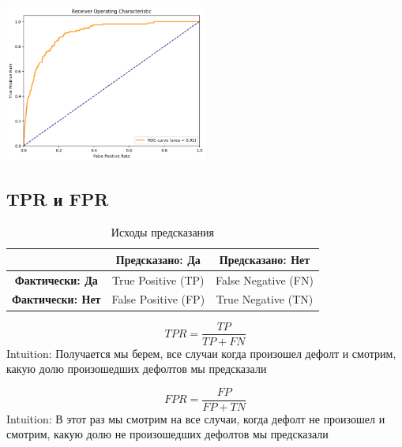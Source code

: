 \documentclass{article}
\begin{document}
        \begin{center}
            \includegraphics[width=0.5\textwidth]{photos/roc.png}
        \end{center}



        \subsection{TPR и FPR}
            \begin{table}[h] %
                \centering %
                \caption{Исходы предсказания} %
                \begin{tabular}{|c|c|c|}
                    \hline
                    & \textbf{Предсказано: Да} & \textbf{Предсказано: Нет} \\ \hline
                    \textbf{Фактически: Да} & True Positive (TP) & False Negative (FN) \\ \hline
                    \textbf{Фактически: Нет} & False Positive (FP) & True Negative (TN) \\ \hline
                \end{tabular}
            \end{table}
    
            \begin{equation}
                TPR = \dfrac{TP}{TP + FN}
            \end{equation}
            Intuition: Получается мы берем, все случаи когда произошел дефолт и смотрим, какую
            долю произошедших дефолтов мы предсказали
    
            \begin{equation}
                FPR = \dfrac{FP}{FP + TN}
            \end{equation}
            Intuition: В этот раз мы смотрим на все случаи, когда дефолт не произошел и смотрим, какую долю
            не произошедших дефолтов мы предсказали
    
\end{document}
